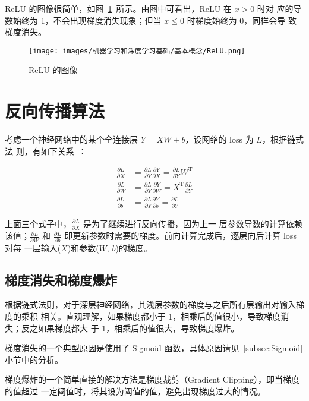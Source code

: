 ReLU 的图像很简单，如图~\ref{fig:ReLU}~所示。由图中可看出，ReLU 在 $x > 0$ 时对
应的导数始终为 1，不会出现梯度消失现象；但当 $x \leq 0$ 时梯度始终为 0，同样会导
致梯度消失。

\begin{figure}[ht]
  \centering
  \texttt{[image: images/机器学习和深度学习基础/基本概念/ReLU.png]}
  \caption{ReLU 的图像}
  \label{fig:ReLU}
\end{figure}

\section{反向传播算法}
考虑一个神经网络中的某个全连接层 $Y = XW + b$，设网络的 loss 为 $L$，根据链式法
则，有如下关系~：

\begin{align}
  \label{equ:bp-fc}
  \frac{\partial L}{\partial X} & = \frac{\partial L}{\partial Y} \frac{\partial Y}{\partial X} = \frac{\partial L}{\partial Y} W^{\mathrm{T}} \\
  \frac{\partial L}{\partial W} & = \frac{\partial L}{\partial Y} \frac{\partial Y}{\partial W} = X^{\mathrm{T}} \frac{\partial L}{\partial Y}\\
  \frac{\partial L}{\partial b} & = \frac{\partial L}{\partial Y} \frac{\partial Y}{\partial b} = \frac{\partial L}{\partial Y}
\end{align}

上面三个式子中，$\frac{\partial L}{\partial X}$ 是为了继续进行反向传播，因为上一
层参数导数的计算依赖该值；$\frac{\partial L}{\partial W}$ 和 $\frac{\partial
  L}{\partial b}$ 即更新参数时需要的梯度。前向计算完成后，逐层向后计算 loss 对每
一层输入($X$)和参数($W, \, b$)的梯度。

\subsection{梯度消失和梯度爆炸}
\label{subsec:gradient-vanish-explosion}
根据链式法则，对于深层神经网络，其浅层参数的梯度与之后所有层输出对输入梯度的乘积
相关。直观理解，如果梯度都小于 1，相乘后的值很小，导致梯度消失；反之如果梯度都大
于 1，相乘后的值很大，导致梯度爆炸。

梯度消失的一个典型原因是使用了 Sigmoid 函数，具体原因请见~\ref{subsec:Sigmoid}小节中的分析。

梯度爆炸的一个简单直接的解决方法是梯度裁剪（Gradient Clipping），即当梯度的值超过
一定阈值时，将其设为阈值的值，避免出现梯度过大的情况。

